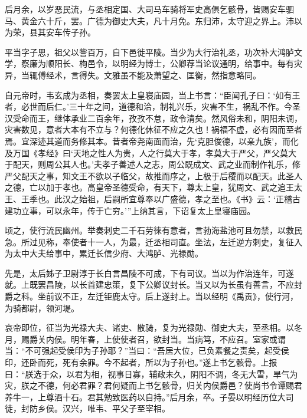 \documentclass[12pt,UTF8]{ctexbook}
\begin{document}
后月余，以岁恶民流，与丞相定国、大司马车骑将军史高俱乞骸骨，皆赐安车驷马、黄金六十斤，罢。广德为御史大夫，凡十月免。东归沛，太守迎之界上。沛以为荣，县其安车传子孙。



平当字子思，祖父以訾百万，自下邑徙平陵。当少为大行治礼丞，功次补大鸿胪文学，察廉为顺阳长、栒邑令，以明经为博士，公卿荐当论议通明，给事中。每有灾异，当辄傅经术，言得失。文雅虽不能及萧望之、匡衡，然指意略同。



自元帝时，韦玄成为丞相，奏罢太上皇寝庙园，当上书言：“臣闻孔子曰：‘如有王者，必世而后仁。’三十年之间，道德和洽，制礼兴乐，灾害不生，祸乱不作。今圣汉受命而王，继体承业二百余年，孜孜不怠，政令清矣。然风俗未和，阴阳未调，灾害数见，意者大本有不立与？何德化休征不应之久也！祸福不虚，必有因而至者焉。宜深迹其道而务修其本。昔者帝尧南面而治，先‘克胆俊德，以亲九族’，而化及万国《孝经》曰‘天地之性人为贵，人之行莫大于孝，孝莫大于严父，严父莫大于配天，则周公其人也。’夫孝子善述人之志，周公既成文、武之业而制作礼乐，修严父配天之事，知文王不欲以子临父，故推而序之，上极于后稷而以配天。此圣人之德，亡以加于孝也。高皇帝圣德受命，有天下，尊太上皇，犹周文、武之追王太王、王季也。此汉之始祖，后嗣所宜尊奉以广盛德，孝之至也。《书》云：‘正稽古建功立事，可以永年，传于亡穷。’”上纳其言，下诏复太上皇寝庙园。



顷之，使行流民幽州。举奏刺史二千石劳徠有意者，言勃海盐池可且勿禁，以救民急。所过见称，奉使者十一人，为最，迁丞相司直。坐法，左迁逆方刺史，复征入为太中大夫给事中，累迁长信少府、大鸿胪、光禄勋。



先是，太后姊子卫尉淳于长白言昌陵不可成，下有司议。当以为作治连年，可遂就。上既罢昌陵，以长首建忠策，复下公卿议封长。当又以为长虽有善言，不应封爵之科。坐前议不正，左迁钜鹿太守。后上遂封上。当以经明《禹贡》，使行河，为骑都尉，领河堤。



哀帝即位，征当为光禄大夫、诸吏、散骑，复为光禄勋、御史大夫，至丞相。以冬月，赐爵关内侯。明年春，上使使者召，欲封当。当病笃，不应召。室家或谓当：“不可强起受侯印为子孙耶？”当曰：“吾居大位，已负素餐之责矣，起受侯印，还卧而死，死有余罪。今不起者，所以为子孙也。”遂上书乞骸骨。上报曰：“朕选于众，以君为相，视事日寡，辅政未久，阴阳不调，冬无大雪，旱气为灾，朕之不德，何必君罪？君何疑而上书乞骸骨，归关内侯爵邑？使尚书令谭赐君养牛一，上尊酒十石。君其勉致医药以自持。”后月余，卒。子晏以明经历位大司徒，封防乡侯。汉兴，唯韦、平父子至宰相。
\end{document}
